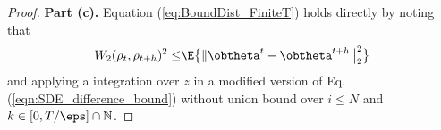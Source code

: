 \documentclass[11pt]{article}
\begin{document}
\begin{proof}
\noindent
{\bf Part (c). } Equation (\ref{eq:BoundDist_FiniteT}) holds directly by noting that 
\[
\begin{aligned}
W_2(\rho_t,\rho_{t+h})^2 \le& \E\big\{\|\obtheta^t-\obtheta^{t+h}\big\|_2^2\big\} \\
\end{aligned}
\]
and applying a integration over $z$ in a modified version of Eq. (\ref{eqn:SDE_difference_bound}) without union bound over $i \le N$ and $k \in [0, T/\eps] \cap \mathbb N$. 



\end{proof}
\end{document}
